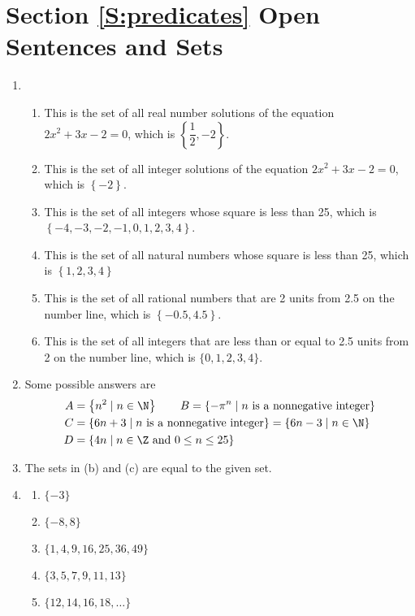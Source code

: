\section*{Section \ref{S:predicates} Open Sentences and Sets}

\begin{enumerate}
\item \begin{enumerate}
\item This is the set of all real number solutions of the equation $2x^2 + 3x - 2 = 0$, which is $\left\{ {\dfrac{1}{2}, - 2} \right\}$. 
\item This is the set of all integer solutions of the equation $2x^2 + 3x - 2 = 0$, which is $\left\{ {- 2} \right\}$.
\item This is the set of all integers whose square is less than 25, which is 
$\left\{ -4, -3, -2, -1, 0, 1, 2, 3, 4 \right\}$.
\item This is the set of all natural numbers whose square is less than 25, which is 
$\left\{ {1,2,3,4} \right\}$
\item This is the set of all rational numbers that are 2 units from 2.5 on the number line, which is $\left\{ {-0.5,4.5} \right\}$.
\item This is the set of all integers that are less than or equal to 2.5 units from 2 on the number line, which is $\{0, 1, 2, 3, 4\}$.
\end{enumerate}

\item Some possible answers are
\begin{align*}
A &= \left\{ n^2 \mid n \in \N \right\}  \qquad B = \left\{ -\pi^n \mid n \text{~is a nonnegative integer} \right\} \\
C &= \left\{ 6n + 3 \mid n \text{~is a nonnegative integer} \right\}  = \left\{6n - 3 \mid n \in \N \right\}\\
D &= \left\{ 4n \mid n \in \Z \text{~and~} 0 \leq n \leq 25 \right\}
\end{align*}

\item The sets in (b) and (c) are equal to the given set.


\item \begin{multicols}{2}
\begin{enumerate}
\item $\{ -3 \}$
\item $\{ -8, 8 \}$
\item $\{ 1, 4, 9, 16, 25, 36, 49 \}$
\item $\{ 3, 5, 7, 9, 11, 13 \}$
\item $\{ 12, 14, 16, 18, \ldots \}$
\end{enumerate}
\end{multicols}




\end{enumerate}

